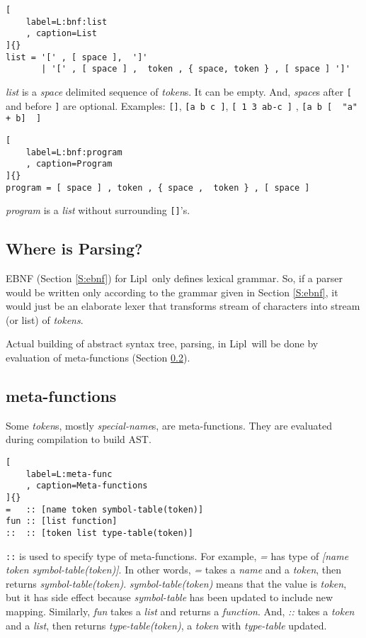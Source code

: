 \documentclass[12pt,letterpaper,notitlepage]{article}
\newcommand{\lipl}{Lipl}
\newcommand{\op}{meta-function}
\begin{document}
\begin{lstlisting}[
    label=L:bnf:list
    , caption=List
]{}
list = '[' , [ space ],  ']'
       | '[' , [ space ] ,  token , { space, token } , [ space ] ']'
\end{lstlisting}
\emph{list} is a \emph{space} delimited sequence of \emph{token}s.
It can be empty.
And, \emph{space}s after \verb![! and before \verb!]! are optional.
Examples: \verb![]!, \verb![a b c ]!, \verb![ 1 3 ab-c ]!
, \verb![a b [  "a" + b]  ]!

\begin{lstlisting}[
    label=L:bnf:program
    , caption=Program
]{}
program = [ space ] , token , { space ,  token } , [ space ]
\end{lstlisting}
\emph{program} is a \emph{list} without surrounding \verb![]!'s.

\subsection{Where is Parsing?}

EBNF (Section \ref{S:ebnf}) for \lipl\ only defines lexical grammar.
So, if a parser would be written only according to the grammar given in
Section \ref{S:ebnf}, it would just be an elaborate lexer that
transforms stream of characters into stream (or list) of \emph{tokens}.

Actual building of abstract syntax tree, parsing, in \lipl\
will be done by evaluation of \op s (Section \ref{S:ops}).

\subsection{\op s}
\label{S:ops}

Some \emph{token}s, mostly \emph{special-name}s, are \op s.
They are evaluated during compilation to build AST.

\begin{lstlisting}[
    label=L:meta-func
    , caption=Meta-functions
]{}
=   :: [name token symbol-table(token)]
fun :: [list function]
::  :: [token list type-table(token)]
\end{lstlisting}
\verb!::! is used to specify type of \op s.
For example, \emph{=} has type of \emph{[name token symbol-table(token)]}.
In other words, \emph{=} takes a \emph{name} and a \emph{token},
then returns \emph{symbol-table(token)}.
\emph{symbol-table(token)} means that the value is \emph{token},
but it has side effect because \emph{symbol-table} has been updated to
include new mapping.
Similarly, \emph{fun} takes a \emph{list} and returns a \emph{function}.
And, \emph{::} takes a \emph{token} and a \emph{list},
then returns \emph{type-table(token)}, a \emph{token} with
\emph{type-table} updated.
\end{document}

